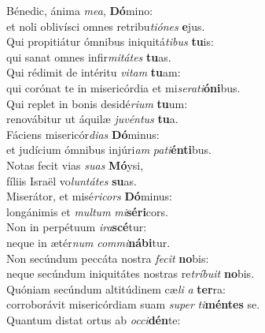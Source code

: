 \evenverse Bénedic, ánima \textit{me}\textit{a}, \textbf{Dó}mino:~\*\\
\evenverse et noli oblivísci omnes retribu\textit{ti}\textit{ó}\textit{nes} \textbf{e}jus.\\
\oddverse Qui propitiátur ómnibus iniquitá\textit{ti}\textit{bus} \textbf{tu}is:~\*\\
\oddverse qui sanat omnes infir\textit{mi}\textit{tá}\textit{tes} \textbf{tu}as.\\
\evenverse Qui rédimit de intéritu \textit{vi}\textit{tam} \textbf{tu}am:~\*\\
\evenverse qui corónat te in misericórdia et mi\textit{se}\textit{ra}\textit{ti}\textbf{ó}\textbf{ni}bus.\\
\oddverse Qui replet in bonis desidé\textit{ri}\textit{um} \textbf{tu}um:~\*\\
\oddverse renovábitur ut áquilæ \textit{ju}\textit{vén}\textit{tus} \textbf{tu}a.\\
\evenverse Fáciens misericór\textit{di}\textit{as} \textbf{Dó}minus:~\*\\
\evenverse et judícium ómnibus injúri\textit{am} \textit{pa}\textit{ti}\textbf{én}\textbf{ti}bus.\\
\oddverse Notas fecit vias \textit{su}\textit{as} \textbf{Mó}ysi,~\*\\
\oddverse fíliis Israël vo\textit{lun}\textit{tá}\textit{tes} \textbf{su}as.\\
\evenverse Miserátor, et misé\textit{ri}\textit{cors} \textbf{Dó}minus:~\*\\
\evenverse longánimis et \textit{mul}\textit{tum} \textit{mi}\textbf{sé}\textbf{ri}cors.\\
\oddverse Non in perpétuum \textit{i}\textit{ra}\textbf{scé}tur:~\*\\
\oddverse neque in ætér\textit{num} \textit{com}\textit{mi}\textbf{ná}\textbf{bi}tur.\\
\evenverse Non secúndum peccáta nostra \textit{fe}\textit{cit} \textbf{no}bis:~\*\\
\evenverse neque secúndum iniquitátes nostras re\textit{trí}\textit{bu}\textit{it} \textbf{no}bis.\\
\oddverse Quóniam secúndum altitúdinem cæ\textit{li} \textit{a} \textbf{ter}ra:~\*\\
\oddverse corroborávit misericórdiam suam \textit{su}\textit{per} \textit{ti}\textbf{mén}\textbf{tes} se.\\
\evenverse Quantum distat ortus ab \textit{oc}\textit{ci}\textbf{dén}te:~\*\\
